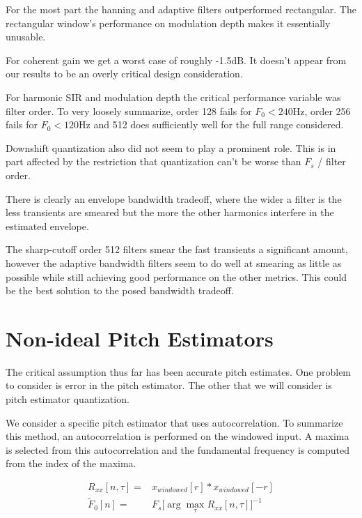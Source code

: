 \documentclass [11pt, proquest,oneside] {ganter_thesis}[2015/03/03]
\begin{document}
For the most part the hanning and adaptive filters outperformed rectangular.  The rectangular window's performance on modulation depth makes it essentially unusable.

For coherent gain we get a worst case of roughly -1.5dB.  It doesn't appear from our results to be an overly critical design consideration.

For harmonic SIR and modulation depth the critical performance variable was filter order.  To very loosely summarize, order 128 fails for $F_0 < 240$Hz, order 256 fails for $F_0 < 120$Hz and 512 does sufficiently well for the full range considered.

Downshift quantization also did not seem to play a prominent role.  This is in part affected by the restriction that quantization can't be worse than $F_s$ / filter order.

There is clearly an envelope bandwidth tradeoff, where the wider a filter is the less transients are smeared but the more the other harmonics interfere in the estimated envelope.

The sharp-cutoff order 512 filters smear the fast transients a significant amount, however the adaptive bandwidth filters seem to do well at smearing as little as possible while still achieving good performance on the other metrics.  This could be the best solution to the posed bandwidth tradeoff.


\section{Non-ideal Pitch Estimators}

The critical assumption thus far has been accurate pitch estimates.  One problem to consider is error in the pitch estimator.  The other that we will consider is pitch estimator quantization.

We consider a specific pitch estimator that uses autocorrelation.  To summarize this method, an autocorrelation is performed on the windowed input.  A maxima is selected from this autocorrelation and the fundamental frequency is computed from the index of the maxima.

\begin{align}
R_{xx}[n,\tau] =& x_{windowed}[r] * x_{windowed}[-r] \\
\tilde{F}_0[n] =& F_s \Bigg[ \arg\max_\tau R_{xx}[n,\tau] \Bigg]^{-1}
\end{align}
\end{document}
